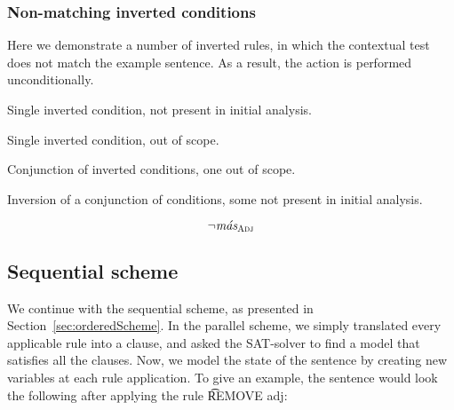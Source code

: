 \subsubsection{Non-matching inverted conditions}

Here we demonstrate a number of inverted rules, in which the contextual test does not match the example sentence. As a result, the action is performed unconditionally.

 Single inverted condition, not present in initial analysis.

 Single inverted condition, out of scope.

 Conjunction of inverted conditions, one out of scope.

 Inversion of a conjunction of conditions, some not present in initial analysis.

\begin{equation}
 \neg{}\text{\em m\'{a}s}_{\text{\sc Adj}} 
\end{equation}







\subsection{Sequential scheme}


We continue with the sequential scheme, as presented in Section~\ref{sec:orderedScheme}.
In the parallel scheme, we simply translated every applicable rule into a clause, and asked the SAT-solver to find a model that satisfies all the clauses. 
Now, we model the state of the sentence by creating new variables at each rule application. 
To give an example, the sentence would look the following after applying the rule \t{REMOVE adj}:

